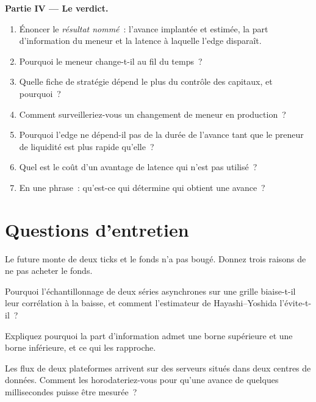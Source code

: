 \begin{problem}
\medskip\noindent\textbf{Partie IV --- Le verdict.}
\begin{enumerate}[resume]
\item Énoncer le \emph{résultat nommé}~: l'avance implantée et estimée, la part d'information du meneur et la latence à laquelle l'edge disparaît.
\item Pourquoi le meneur change-t-il au fil du temps~?
\item Quelle fiche de stratégie dépend le plus du contrôle des capitaux, et pourquoi~?
\item Comment surveilleriez-vous un changement de meneur en production~?
\item Pourquoi l'edge ne dépend-il pas de la durée de l'avance tant que le preneur de liquidité est plus rapide qu'elle~?
\item Quel est le coût d'un avantage de latence qui n'est pas utilisé~?
\item En une phrase~: qu'est-ce qui détermine qui obtient une avance~?
\end{enumerate}
\end{problem}

\section{Questions d'entretien}

\begin{interviewq}\label{iq:hf:lead-lag-and-cross-venue-trading:1}
Le future monte de deux ticks et le fonds n'a pas bougé. Donnez trois raisons de ne pas acheter le fonds.
\end{interviewq}

\begin{interviewq}\label{iq:hf:lead-lag-and-cross-venue-trading:2}
Pourquoi l'échantillonnage de deux séries asynchrones sur une grille biaise-t-il leur corrélation à la baisse, et comment l'estimateur de Hayashi--Yoshida l'évite-t-il~?
\end{interviewq}

\begin{interviewq}\label{iq:hf:lead-lag-and-cross-venue-trading:3}
Expliquez pourquoi la part d'information admet une borne supérieure et une borne inférieure, et ce qui les rapproche.
\end{interviewq}

\begin{interviewq}\label{iq:hf:lead-lag-and-cross-venue-trading:4}
Les flux de deux plateformes arrivent sur des serveurs situés dans deux centres de données. Comment les horodateriez-vous pour qu'une avance de quelques millisecondes puisse être mesurée~?
\end{interviewq}

